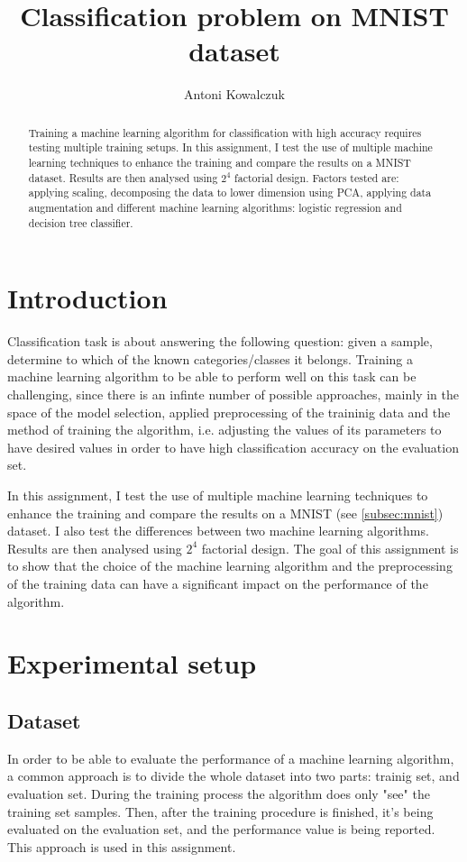 \documentclass{article}
\title{Classification problem on MNIST dataset}
\author{%
  Antoni Kowalczuk \\
}
\begin{document}
\maketitle


\begin{abstract}
    Training a machine learning algorithm for classification with high accuracy requires testing multiple training setups. In this assignment, I test the use of multiple machine learning techniques to enhance the training and compare the results on a MNIST dataset. Results are then analysed using $2^4$ factorial design. Factors tested are: applying scaling, decomposing the data to lower dimension using PCA, applying data augmentation and different machine learning algorithms: logistic regression and decision tree classifier.
\end{abstract}


\section{Introduction}
Classification task is about answering the following question: given a sample, determine to which of the known categories/classes it belongs. Training a machine learning algorithm to be able to perform well on this task can be challenging, since there is an infinte number of possible approaches, mainly in the space of the model selection, applied preprocessing of the traininig data and the method of training the algorithm, i.e. adjusting the values of its parameters to have desired values in order to have high classification accuracy on the evaluation set.

In this assignment, I test the use of multiple machine learning techniques to enhance the training and compare the results on a MNIST (see \ref{subsec:mnist}) dataset. I also test the differences between two machine learning algorithms. Results are then analysed using $2^4$ factorial design. The goal of this assignment is to show that the choice of the machine learning algorithm and the preprocessing of the training data can have a significant impact on the performance of the algorithm.

\section{Experimental setup}

\subsection{Dataset}
\label{subsec:dataset}
In order to be able to evaluate the performance of a machine learning algorithm, a common approach is to divide the whole dataset into two parts: trainig set, and evaluation set. During the training process the algorithm does only "see" the training set samples. Then, after the training procedure is finished, it's being evaluated on the evaluation set, and the performance value is being reported. This approach is used in this assignment.
\end{document}

